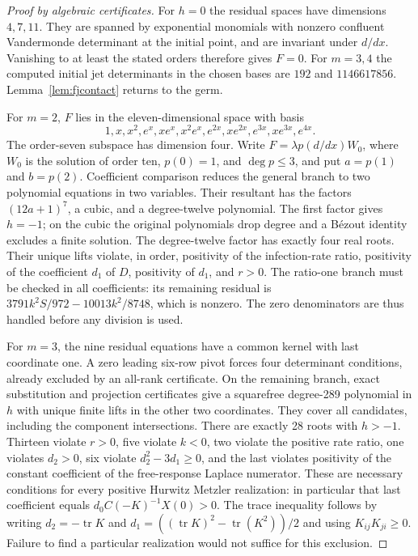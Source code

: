 \documentclass[11pt]{article}
\theoremstyle{remark}\newtheorem{remark}[theorem]{Remark}
\begin{document}
\begin{proof}[Proof by algebraic certificates]
For $h=0$ the residual spaces have dimensions $4,7,11$.
They are spanned by exponential monomials with nonzero confluent
Vandermonde determinant at the initial point, and are invariant under
$d/dx$. Vanishing to at least the stated orders therefore gives $F=0$.
For $m=3,4$ the computed initial jet determinants in the chosen bases are
$192$ and $1146617856$. Lemma~\ref{lem:fjcontact} returns to the germ.

For $m=2$, $F$ lies in the eleven-dimensional space with basis
\[
 1,x,x^2,e^x,xe^x,x^2e^x,e^{2x},xe^{2x},e^{3x},xe^{3x},e^{4x}.
\]
The order-seven subspace has dimension four. Write
$F=\lambda p(d/dx)W_0$, where $W_0$ is the solution of order ten,
$p(0)=1$, and $\deg p\leq3$, and put $a=p(1)$ and $b=p(2)$.
Coefficient comparison
reduces the general branch to two polynomial equations in two variables.
Their resultant has the factors $(12a+1)^7$, a cubic, and a degree-twelve
polynomial. The first factor gives $h=-1$; on the cubic the original
polynomials drop degree and a B\'ezout identity excludes a finite solution.
The degree-twelve factor has exactly four real roots. Their unique lifts
violate, in order, positivity of the infection-rate ratio, positivity of
the coefficient $d_1$ of $D$, positivity of $d_1$, and $r>0$.
The ratio-one branch must be checked in all coefficients: its remaining
residual is $3791k^2S/972-10013k^2/8748$, which is nonzero.
The zero denominators are thus handled before any division is used.

For $m=3$, the nine residual equations have a common kernel with last
coordinate one. A zero leading six-row pivot forces four determinant
conditions, already excluded by an all-rank certificate. On the remaining
branch, exact substitution and projection certificates give a squarefree
degree-289 polynomial in $h$ with unique finite lifts in the other two
coordinates. They cover all candidates, including the component
intersections. There are exactly 28 roots with $h>-1$. Thirteen violate
$r>0$, five violate $k<0$, two violate the positive rate ratio, one violates
$d_2>0$, six violate $d_2^2-3d_1\geq0$, and the last violates positivity
of the constant coefficient of the free-response Laplace numerator.
These are necessary conditions for every positive Hurwitz Metzler
realization: in particular that last coefficient equals
$d_0C(-K)^{-1}X(0)>0$. The trace inequality follows by writing
$d_2=-\operatorname{tr}K$ and
$d_1=((\operatorname{tr}K)^2-\operatorname{tr}(K^2))/2$ and using
$K_{ij}K_{ji}\geq0$. Failure to find a particular realization would
not suffice for this exclusion.


\end{proof}
\end{document}
